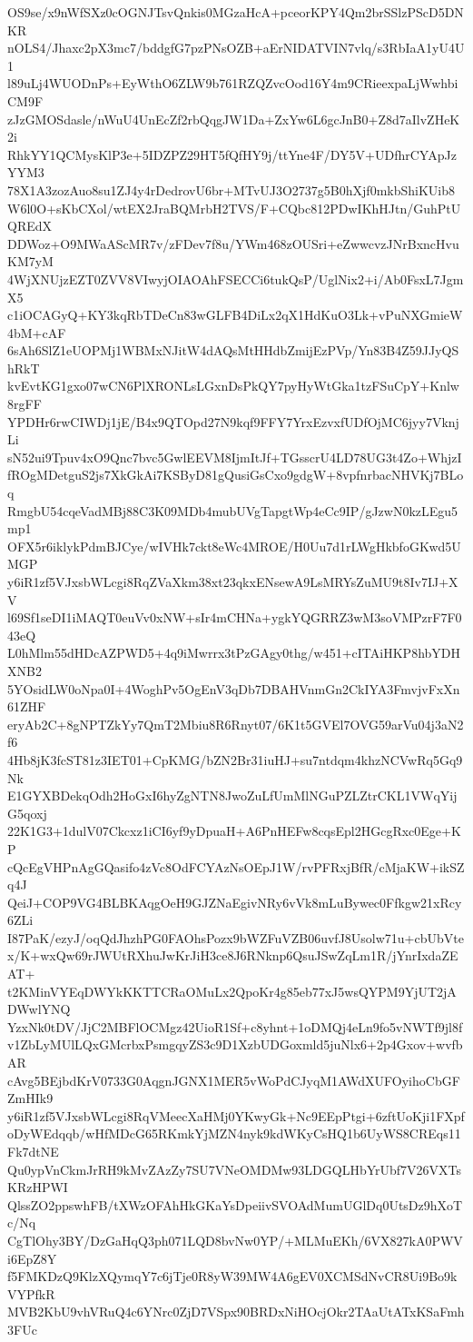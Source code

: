 OS9se/x9nWfSXz0cOGNJTsvQnkis0MGzaHcA+pceorKPY4Qm2brSSlzPScD5DNKR
nOLS4/Jhaxc2pX3mc7/bddgfG7pzPNsOZB+aErNIDATVIN7vlq/s3RbIaA1yU4U1
l89uLj4WUODnPs+EyWthO6ZLW9b761RZQZvcOod16Y4m9CRieexpaLjWwhbiCM9F
zJzGMOSdasle/nWuU4UnEcZf2rbQqgJW1Da+ZxYw6L6gcJnB0+Z8d7aIlvZHeK2i
RhkYY1QCMysKlP3e+5IDZPZ29HT5fQfHY9j/ttYne4F/DY5V+UDfhrCYApJzYYM3
78X1A3zozAuo8su1ZJ4y4rDedrovU6br+MTvUJ3O2737g5B0hXjf0mkbShiKUib8
W6l0O+sKbCXol/wtEX2JraBQMrbH2TVS/F+CQbc812PDwIKhHJtn/GuhPtUQREdX
DDWoz+O9MWaAScMR7v/zFDev7f8u/YWm468zOUSri+eZwwcvzJNrBxncHvuKM7yM
4WjXNUjzEZT0ZVV8VIwyjOIAOAhFSECCi6tukQsP/UglNix2+i/Ab0FsxL7JgmX5
c1iOCAGyQ+KY3kqRbTDeCn83wGLFB4DiLx2qX1HdKuO3Lk+vPuNXGmieW4bM+cAF
6sAh6SlZ1eUOPMj1WBMxNJitW4dAQsMtHHdbZmijEzPVp/Yn83B4Z59JJyQShRkT
kvEvtKG1gxo07wCN6PlXRONLsLGxnDsPkQY7pyHyWtGka1tzFSuCpY+Knlw8rgFF
YPDHr6rwCIWDj1jE/B4x9QTOpd27N9kqf9FFY7YrxEzvxfUDfOjMC6jyy7VknjLi
sN52ui9Tpuv4xO9Qnc7bvc5GwlEEVM8IjmItJf+TGsscrU4LD78UG3t4Zo+WhjzI
fROgMDetguS2js7XkGkAi7KSByD81gQusiGsCxo9gdgW+8vpfnrbacNHVKj7BLoq
RmgbU54cqeVadMBj88C3K09MDb4mubUVgTapgtWp4eCc9IP/gJzwN0kzLEgu5mp1
OFX5r6iklykPdmBJCye/wIVHk7ckt8eWc4MROE/H0Uu7d1rLWgHkbfoGKwd5UMGP
y6iR1zf5VJxsbWLcgi8RqZVaXkm38xt23qkxENsewA9LsMRYsZuMU9t8Iv7IJ+XV
l69Sf1seDI1iMAQT0euVv0xNW+sIr4mCHNa+ygkYQGRRZ3wM3soVMPzrF7F043eQ
L0hMlm55dHDcAZPWD5+4q9iMwrrx3tPzGAgy0thg/w451+cITAiHKP8hbYDHXNB2
5YOsidLW0oNpa0I+4WoghPv5OgEnV3qDb7DBAHVnmGn2CkIYA3FmvjvFxXn61ZHF
eryAb2C+8gNPTZkYy7QmT2Mbiu8R6Rnyt07/6K1t5GVEl7OVG59arVu04j3aN2f6
4Hb8jK3fcST81z3IET01+CpKMG/bZN2Br31iuHJ+su7ntdqm4khzNCVwRq5Gq9Nk
E1GYXBDekqOdh2HoGxI6hyZgNTN8JwoZuLfUmMlNGuPZLZtrCKL1VWqYijG5qoxj
22K1G3+1dulV07Ckcxz1iCI6yf9yDpuaH+A6PnHEFw8cqsEpl2HGcgRxc0Ege+KP
cQcEgVHPnAgGQasifo4zVc8OdFCYAzNsOEpJ1W/rvPFRxjBfR/cMjaKW+ikSZq4J
QeiJ+COP9VG4BLBKAqgOeH9GJZNaEgivNRy6vVk8mLuBywec0Ffkgw21xRcy6ZLi
I87PaK/ezyJ/oqQdJhzhPG0FAOhsPozx9bWZFuVZB06uvfJ8Usolw71u+cbUbVte
x/K+wxQw69rJWUtRXhuJwKrJiH3ce8J6RNknp6QsuJSwZqLm1R/jYnrIxdaZEAT+
t2KMinVYEqDWYkKKTTCRaOMuLx2QpoKr4g85eb77xJ5wsQYPM9YjUT2jADWwlYNQ
YzxNk0tDV/JjC2MBFlOCMgz42UioR1Sf+c8yhnt+1oDMQj4eLn9fo5vNWTf9jl8f
v1ZbLyMUlLQxGMcrbxPsmgqyZS3c9D1XzbUDGoxmld5juNlx6+2p4Gxov+wvfbAR
cAvg5BEjbdKrV0733G0AqgnJGNX1MER5vWoPdCJyqM1AWdXUFOyihoCbGFZmHIk9
y6iR1zf5VJxsbWLcgi8RqVMeecXaHMj0YKwyGk+Nc9EEpPtgi+6zftUoKji1FXpf
oDyWEdqqb/wHfMDcG65RKmkYjMZN4nyk9kdWKyCsHQ1b6UyWS8CREqs11Fk7dtNE
Qu0ypVnCkmJrRH9kMvZAzZy7SU7VNeOMDMw93LDGQLHbYrUbf7V26VXTsKRzHPWI
QlssZO2ppswhFB/tXWzOFAhHkGKaYsDpeiivSVOAdMumUGlDq0UtsDz9hXoTc/Nq
CgTlOhy3BY/DzGaHqQ3ph071LQD8bvNw0YP/+MLMuEKh/6VX827kA0PWVi6EpZ8Y
f5FMKDzQ9KlzXQymqY7c6jTje0R8yW39MW4A6gEV0XCMSdNvCR8Ui9Bo9kVYPfkR
MVB2KbU9vhVRuQ4c6YNrc0ZjD7VSpx90BRDxNiHOcjOkr2TAaUtATxKSaFmh3FUc
